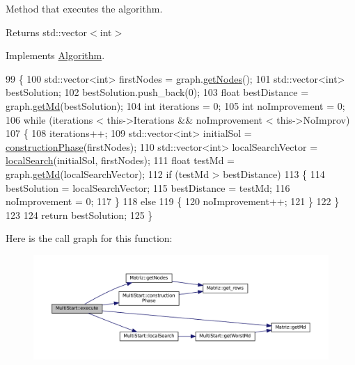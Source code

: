 Method that executes the algorithm. 

\begin{DoxyReturn}{Returns}
std\+::vector$<$int$>$ 
\end{DoxyReturn}


Implements \hyperlink{classAlgorithm_af6ea9eb9a6dbd41896e3fd7dabac096b}{Algorithm}.


\begin{DoxyCode}
99 \{
100   std::vector<int> firstNodes = graph.\hyperlink{classMatriz_a394b84a5ec13fd2f4d202ab218680afe}{getNodes}();
101   std::vector<int> bestSolution;
102   bestSolution.push\_back(0);
103   \textcolor{keywordtype}{float} bestDistance = graph.\hyperlink{classMatriz_a8df14a27d791f24206dd633b2a685c5b}{getMd}(bestSolution);
104   \textcolor{keywordtype}{int} iterations = 0;
105   \textcolor{keywordtype}{int} noImprovement = 0;
106   \textcolor{keywordflow}{while} (iterations < this->Iterations && noImprovement < this->NoImprov)
107   \{
108     iterations++;
109     std::vector<int> initialSol = \hyperlink{classMultiStart_a29c5796648ede3e6c7fe8ca8043f8187}{constructionPhase}(firstNodes);
110     std::vector<int> localSearchVector = \hyperlink{classMultiStart_af27ae5dbba5f924070f103b7bf5987a3}{localSearch}(initialSol, firstNodes);
111     \textcolor{keywordtype}{float} testMd = graph.\hyperlink{classMatriz_a8df14a27d791f24206dd633b2a685c5b}{getMd}(localSearchVector);
112     \textcolor{keywordflow}{if} (testMd > bestDistance)
113     \{
114       bestSolution = localSearchVector;
115       bestDistance = testMd;
116       noImprovement = 0;
117     \}
118     \textcolor{keywordflow}{else}
119     \{
120       noImprovement++;
121     \}
122   \}
123 
124   \textcolor{keywordflow}{return} bestSolution;
125 \}
\end{DoxyCode}
Here is the call graph for this function\+:
\nopagebreak
\begin{figure}[H]
\begin{center}
\leavevmode
\includegraphics[width=350pt]{classMultiStart_a9d842b1f602c4b8a47bf6d88d483ccae_cgraph}
\end{center}
\end{figure}
